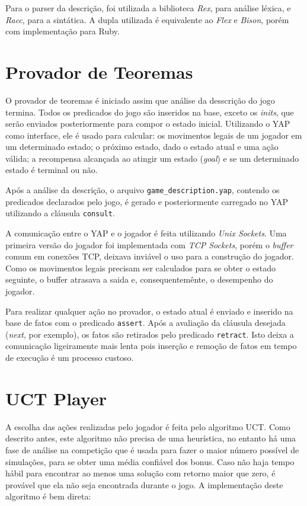  Para o parser da descrição, foi utilizada a biblioteca \textit{Rex}, para análise léxica, e \textit{Racc}, para a sintática. A dupla utilizada é equivalente ao \textit{Flex} e \textit{Bison}, porém com implementação para Ruby.
 
 
 \section{Provador de Teoremas}
 O provador de teoremas é iniciado assim que análise da desscrição do jogo termina. Todos os predicados do jogo são inseridos na base, exceto os \textit{inits}, que serão enviados posteriormente para compor o estado inicial. Utilizando o YAP como interface, ele é usado para calcular: os movimentos legais de um jogador em um determinado estado; o próximo estado, dado o estado atual e uma ação válida; a recompensa alcançada ao atingir um estado (\textit{goal}) e se um determinado estado é terminal ou não.
 
 Após a análise da descrição, o arquivo \texttt{game\_description.yap}, contendo os predicados declarados pelo jogo, é gerado e posteriormente carregado no YAP utilizando a cláusula \texttt{consult}. 
 
 A comunicação entre o YAP e o jogador é feita utilizando \textit{Unix Sockets}. Uma primeira versão do jogador foi implementada com \textit{TCP Sockets}, porém o \textit{buffer} comum em conexões TCP, deixava inviável o uso para a construção do jogador. Como os movimentos legais precisam ser calculados para se obter o estado seguinte, o buffer atrasava a saida e, consequentemênte, o desempenho do jogador.
 
Para realizar qualquer ação no provador, o estado atual é enviado e inserido na base de fatos com o predicado \texttt{assert}. Após a avaliação da cláusula desejada (\textit{next}, por exemplo), os fatos são retirados pelo predicado \texttt{retract}. Isto deixa a comunicação ligeiramente mais lenta  pois inserção e remoção de fatos em tempo de execução é um processo custoso.
 

\section{UCT Player} 
A escolha das ações realizadas pelo jogador é feita pelo algoritmo UCT. Como descrito antes, este algoritmo não precisa de uma heurística, no entanto há uma fase de análise na competição que é usada para fazer o maior número possível de simulações, para se obter uma média confiável dos bonus. Caso não haja tempo hábil para encontrar ao menos uma solução com retorno maior que zero, é provável que ela não seja encontrada durante o jogo. A implementação deste algoritmo é bem direta:


